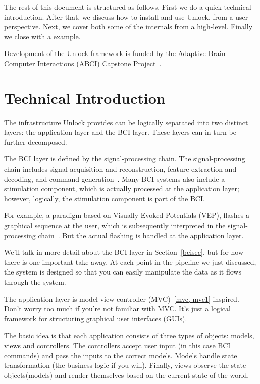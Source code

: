 \documentclass[11pt]{article}
\begin{document}
The rest of this document is structured as follows.  %
First we do a quick technical introduction.  After that, we discuss how to install and use Unlock, from a user perspective.  Next, we cover both some of the internals from a high-level.  Finally we close with a example.

Development of the Unlock framework is funded by the Adaptive Brain-Computer Interactions (ABCI) Capstone Project~\cite{abci}.

\section{Technical Introduction}
The infrastructure Unlock provides can be logically separated into two distinct layers: the application layer and the
BCI layer.  These layers can in turn be further decomposed.

The BCI layer is defined by the signal-processing chain.  The signal-processing chain includes signal acquisition and
reconstruction, feature extraction and decoding, and command generation~\cite{neuraleng}.  Many BCI systems also
include a stimulation component, which is actually processed at the application layer; however, logically, the
stimulation component is part of the BCI.

For example, a paradigm based on Visually Evoked Potentials (VEP), flashes a graphical sequence at the user, which is
subsequently interpreted in the signal-processing chain~\cite{vep}.  But the actual flashing is handled at the
application layer.

We'll talk in more detail about the BCI layer in Section~\ref{bcisec}, but for now there is one important take away.
At each point in the pipeline we just discussed, the system is designed so that you can easily manipulate the data as
it flows through the system.

The application layer is model-view-controller (MVC)~\ref{mvc, mvc1} inspired.  Don't worry too much if you're not
familiar with MVC.  It's just a logical framework for structuring graphical user interfaces (GUIs).

The basic idea is that each application consists of three types of objects: models, views and controllers.  The
controllers accept user input (in this case BCI commands) and pass the inputs to the correct models.  Models handle
state transformation (the business logic if you will).  Finally, views observe the state objects(models) and render
themselves based on the current state of the world.
\end{document}
